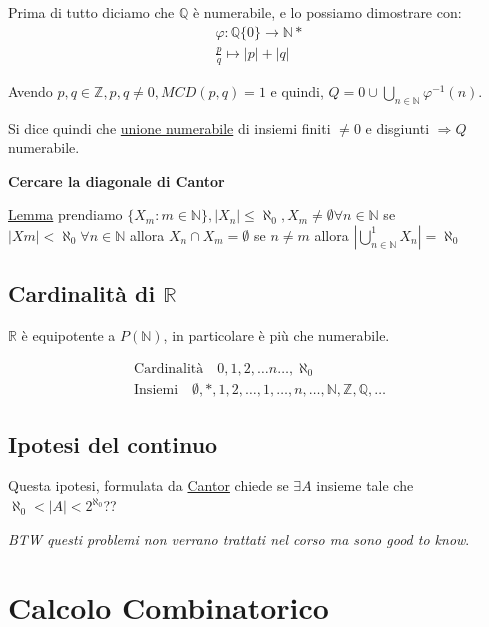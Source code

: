 \documentclass{article}
\begin{document}
Prima di tutto diciamo che $\mathbb{Q}$ è numerabile, e lo possiamo dimostrare con:
\begin{align*}
        \varphi : \mathbb{Q}\{0\} \to \mathbb{N}* \\
        \frac{p}{q} \mapsto |p| + |q|
\end{align*}

Avendo $p,q \in \mathbb{Z}, p,q \not = 0, MCD(p,q)=1$ e quindi, $Q = {0} \cup \bigcup_{n \in \mathbb{N}}{\varphi^{-1}(n)}$.

Si dice quindi che \underline{unione numerabile} di insiemi finiti $\not = 0$ e disgiunti $\Rightarrow Q $ numerabile. \newline

\textbf{Cercare la diagonale di Cantor}

\underline{Lemma} prendiamo $\{X_m : m \in \mathbb{N}\}, |X_n| \le \aleph_0, X_m \not = \emptyset \forall n \in \mathbb{N}$ se $|Xm| < \aleph_0 \forall n \in \mathbb{N}$ allora $X_n \cap X_m = \emptyset$ se $n \not = m$ allora $|\bigcup_{n \in \mathbb{N}}^{1}X_n| = \aleph_0$ \newline


\subsection{Cardinalità di $\mathbb{R}$}
$ \mathbb{R}$ è equipotente a $P(\mathbb{N})$, in particolare è più che numerabile. \par

\begin{align*}
        \mbox{Cardinalità} \quad 0,1,2,\ldots n\ldots,\aleph_0 \\
        \mbox{Insiemi} \quad \emptyset, {*}, {1,2}, \ldots, {1,\ldots,n},\ldots,\mathbb{N},\mathbb{Z},\mathbb{Q},\ldots        
\end{align*}


\subsection{Ipotesi del continuo}
Questa ipotesi, formulata da \underline{Cantor} chiede se $ \exists A$ insieme tale che $\aleph_0 < |A| < 2^{\aleph_0}$?? 

\textit{BTW questi problemi non verrano trattati nel corso ma sono good to know}.




\newpage
\section{Calcolo Combinatorico}
\end{document}

